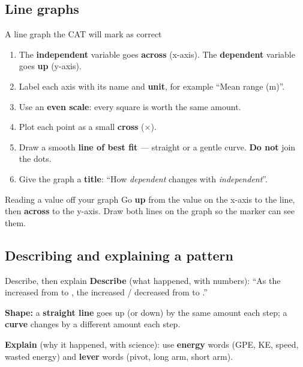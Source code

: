 \documentclass[11pt,a4paper]{article}
\begin{document}
\subsection{Line graphs}\label{sub:3.4}

\begin{skillbox}{A line graph the CAT will mark as correct}
\begin{enumerate}[itemsep=1pt, leftmargin=1.4em, topsep=1pt]
  \item The \textbf{independent} variable goes \textbf{across} (x-axis). The \textbf{dependent} variable goes \textbf{up} (y-axis).
  \item Label each axis with its name and \textbf{unit}, for example ``Mean range (m)''.
  \item Use an \textbf{even scale}: every square is worth the same amount.
  \item Plot each point as a small \textbf{cross} ($\times$).
  \item Draw a smooth \textbf{line of best fit} --- straight or a gentle curve. \textbf{Do not} join the dots.
  \item Give the graph a \textbf{title}: ``How \emph{dependent} changes with \emph{independent}''.
\end{enumerate}
\end{skillbox}

\begin{infobox}{Reading a value off your graph}
Go \textbf{up} from the value on the x-axis to the line, then \textbf{across} to the y-axis. Draw both lines on the graph so the marker can see them.
\end{infobox}

\subsection{Describing and explaining a pattern}\label{sub:3.5}

\begin{skillbox}{Describe, then explain}
\textbf{Describe} (what happened, with numbers): ``As the \underline{\hspace{2.2cm}} increased from \underline{\hspace{1.2cm}} to \underline{\hspace{1.2cm}}, the \underline{\hspace{2.2cm}} increased / decreased from \underline{\hspace{1.2cm}} to \underline{\hspace{1.2cm}}.''

\textbf{Shape:} a \textbf{straight line} goes up (or down) by the same amount each step; a \textbf{curve} changes by a different amount each step.

\textbf{Explain} (why it happened, with science): use \textbf{energy} words (GPE, KE, speed, wasted energy) and \textbf{lever} words (pivot, long arm, short arm).
\end{skillbox}
\end{document}
